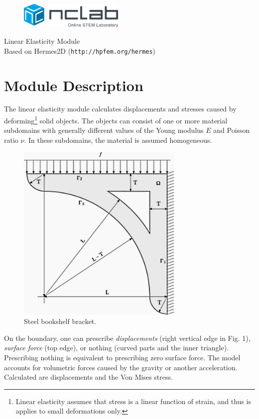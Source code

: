 \documentclass{article}
\begin{document}
\large

\vbox{}
\vspace{-2cm}
\begin{figure}[!ht]
\includegraphics[width=5cm]{img/logo.png}
\vspace{4mm}
\end{figure}
\noindent
\begin{center}
{\Huge Linear Elasticity Module}\\[2mm]
Based on Hermes2D ({\tt http://hpfem.org/hermes})\\[6mm]
\end{center}
\section{Module Description}

The linear elasticity module calculates displacements and stresses 
caused by deforming\footnote{Linear elasticity assumes that stress is a linear function of strain, and thus is applies to small deformations only.} solid objects. 
The objects can consist of one or more material subdomains with generally different values of the Young modulus $E$ and 
Poisson ratio $\nu$. In these subdomains, the material is assumed homogeneous.

\begin{figure}[!ht]
\begin{center}
\includegraphics[width=8cm]{img/elastsample1.png}
\caption{Steel bookshelf bracket.}
\vspace{4mm}
\end{center}
\end{figure}
\noindent
On the boundary, one can prescribe {\em displacements} (right vertical edge 
in Fig. 1), {\em surface force} (top edge), or nothing (curved parts and the 
inner triangle). Prescribing nothing is equivalent to prescribing zero surface force. 
The model accounts for volumetric forces caused by the gravity or another acceleration. 
Calculated are displacements and the Von Mises stress.
\end{document}
